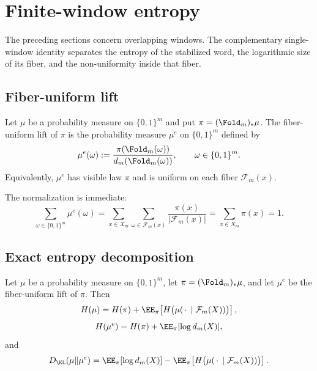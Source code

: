 \section{Finite-window entropy}\label{sec:entropy-ledger}

The preceding sections concern overlapping windows. The complementary single-window identity separates the entropy of the stabilized word, the logarithmic size of its fiber, and the non-uniformity inside that fiber.

\subsection{Fiber-uniform lift}\label{sec:entropy-ledger:lifts}

\begin{definition}\label{def:fiber-lift}
Let $\mu$ be a probability measure on $\{0,1\}^m$ and put
$\pi=(\Fold_m)_*\mu$.  The fiber-uniform lift of $\pi$ is the probability
measure $\mu^e$ on $\{0,1\}^m$ defined by
\[
  \mu^e(\omega)
  :=
  \frac{\pi(\Fold_m(\omega))}{d_m(\Fold_m(\omega))},
  \qquad \omega\in\{0,1\}^m .
\]
Equivalently, $\mu^e$ has visible law $\pi$ and is uniform on each fiber
$\mathcal F_m(x)$.
\end{definition}

\begin{remark}
The normalization is immediate:
\[
\sum_{\omega\in\{0,1\}^m}\mu^e(\omega)
=
\sum_{x\in X_m}\sum_{\omega\in\mathcal{F}_m(x)}\frac{\pi(x)}{|\mathcal{F}_m(x)|}
=
\sum_{x\in X_m}\pi(x)=1.
\]
\end{remark}

\subsection{Exact entropy decomposition}\label{sec:entropy-ledger:identity}

\begin{theorem}\label{thm:kl-ledger}
Let $\mu$ be a probability measure on $\{0,1\}^m$, let
$\pi=(\Fold_m)_*\mu$, and let $\mu^e$ be the fiber-uniform lift of $\pi$.
Then
\[
H(\mu)
=
H(\pi)+\EE_\pi\!\left[
H\bigl(\mu(\,\cdot\,\mid\mathcal F_m(X))\bigr)
\right],
\]
\[
H(\mu^e)=H(\pi)+\EE_\pi[\log d_m(X)],
\]
and
\[
D_{\KL}(\mu\|\mu^e)
=
\EE_\pi[\log d_m(X)]
-
\EE_\pi\!\left[
H\bigl(\mu(\,\cdot\,\mid\mathcal F_m(X))\bigr)
\right].
\]
\end{theorem}

